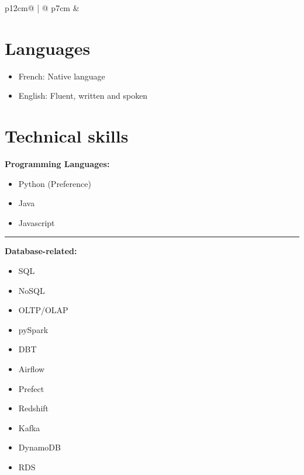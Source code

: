 \documentclass[letterpaper, 11pt]{article}
\begin{document}
\begin{tabular}{p{12cm}@{\hspace{1em}} | @{\hspace{1em}} p{7cm}}
    & %
    
    \section*{Languages}
        \begin{itemize}
            \item French: Native language
            \item English: Fluent, written and spoken
        \end{itemize}
        \vspace{10pt}
    \section*{Technical skills}
        {\large\textbf{Programming Languages:}}
        \begin{itemize}    
            \item Python (Preference)
            \item Java
            \item Javascript
        \end{itemize}
        
        \begin{adjustwidth}{2em}{2em}
                {\color{lightgray}\rule{\linewidth}{1pt}}           
        \end{adjustwidth}
        
        \vspace{3pt}
        {\large\textbf{Database-related:}}
            \begin{multicols}{2}
                \begin{itemize}
                    \item SQL
                    \item NoSQL
                    \item OLTP/OLAP
                    \item pySpark
                    \item DBT
                    \item Airflow
                    \item Prefect
                    \item Redshift    
                    \item Kafka
                    \item DynamoDB
                    \item RDS
                \end{itemize}
            \end{multicols}
            

\end{tabular}
\end{document}
